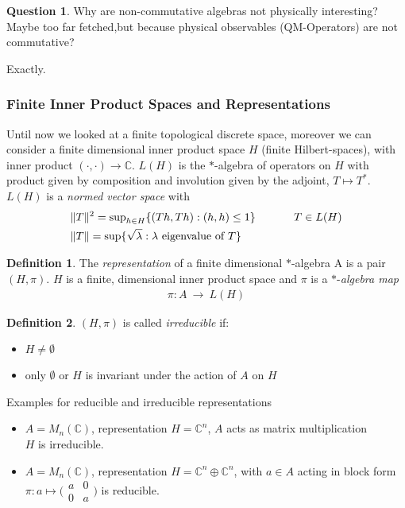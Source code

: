 \documentclass[a4paper]{article}
\theoremstyle{definition}
\newtheorem{definition}{Definition}
\theoremstyle{definition}
\newtheorem{question}{Question}
\theoremstyle{definition}
\theoremstyle{theorem}
\theoremstyle{theorem}
\begin{document}
\begin{question}
    Why are non-commutative algebras not physically interesting?
    Maybe too far fetched,but because physical observables (QM-Operators) are not commutative?
\end{question}
Exactly.

\subsubsection{Finite Inner Product Spaces and Representations}
Until now we looked at a finite topological discrete space, moreover we can consider a
finite dimensional inner product space $H$ (finite Hilbert-spaces), with inner product
$(\cdot,\cdot)\rightarrow \mathbb{C}$. $L(H)$ is the $*$-algebra of operators on $H$
with product given by composition and involution given by the adjoint, $T \mapsto T^*$.
$L(H)$ is a \textit{normed vector space} with
\begin{align*}
    &\|T\|^2 = \text{sup}_{h \in H}\{(Th,Th): (h,h) \leq 1\} \hspace{0.1\textwidth} T \in L(H) \\
    &\|T\| = \text{sup}\{\sqrt{\lambda}: \lambda \text{ eigenvalue of } T\}
\end{align*}


\begin{definition}
    The \textit{representation} of a finite dimensional $*$-algebra A is a pair $(H, \pi)$.
    $H$ is a finite, dimensional inner product space and $\pi$ is a $*$-\textit{algebra map}
    \begin{align*}
        \pi:A\ \rightarrow \ L(H)
    \end{align*}
\end{definition}
\begin{definition}
    $(H, \pi)$ is called \textit{irreducible} if:
    \begin{itemize}
        \item $H \neq \emptyset$
        \item only $\emptyset$ or $H$ is invariant under the action of $A$ on $H$
    \end{itemize}
\end{definition}

Examples for reducible and irreducible representations
\begin{itemize}
    \item $A = M_n(\mathbb{C})$, representation $H=\mathbb{C}^n$, $A$ acts as matrix multiplication\\
            $H$ is irreducible.
    \item $A = M_n(\mathbb{C})$, representation $H=\mathbb{C}^n\oplus \mathbb{C}^n$, with $a \in A$ acting
        in block form \\ $\pi: a \mapsto \big(\begin{smallmatrix} a & 0\\ 0 & a \end{smallmatrix}\big)$ is
            reducible.
\end{itemize}
\end{document}
